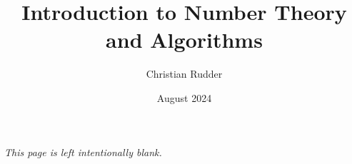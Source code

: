 \documentclass{memoir}
\title{Introduction to Number Theory and Algorithms}
\author{Christian Rudder}
\date{August 2024}
\begin{document}
\maketitle

\tableofcontents

\newpage
\thispagestyle{empty}
\mbox{}
\vfill
\begin{center}
    \textit{This page is left intentionally blank.}
\end{center}
\vfill
\newpage




\end{document}

